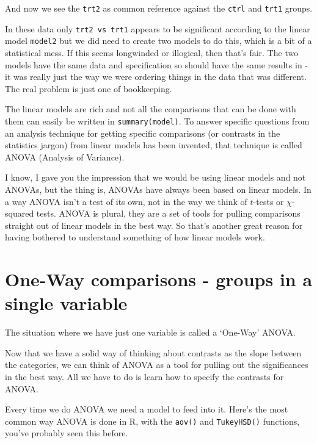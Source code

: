 \documentclass[
]{book}
\newenvironment{sidenote}
{ \begin{tcolorbox}[colbacktitle=blue!50!white,
title=huh?,coltitle=white,
fonttitle=\bfseries] }
{  \end{tcolorbox} }
\begin{document}
And now we see the \texttt{trt2} as common reference against the \texttt{ctrl} and \texttt{trt1} groups.

In these data only \texttt{trt2\ vs\ trt1} appears to be significant according to the linear model \texttt{model2} but we did need to create two models to do this, which is a bit of a statistical mess. If this seems longwinded or illogical, then that's fair. The two models have the same data and specification so should have the same results in - it was really just the way we were ordering things in the data that was different. The real problem is just one of bookkeeping.

The linear models are rich and not all the comparisons that can be done with them can easily be written in \texttt{summary(model)}. To answer specific questions from an analysis technique for getting specific comparisons (or contrasts in the statistics jargon) from linear models has been invented, that technique is called ANOVA (Analysis of Variance).

\begin{sidenote}
I know, I gave you the impression that we would be using linear models and not ANOVAs, but the thing is, ANOVAs have always been based on linear models. In a way ANOVA isn't a test of its own, not in the way we think of \(t\)-tests or \(\chi\)-squared tests. ANOVA is plural, they are a set of tools for pulling comparisons straight out of linear models in the best way. So that's another great reason for having bothered to understand something of how linear models work.
\end{sidenote}

\hypertarget{one-way-comparisons---groups-in-a-single-variable}{%
\section{One-Way comparisons - groups in a single variable}\label{one-way-comparisons---groups-in-a-single-variable}}

The situation where we have just one variable is called a `One-Way' ANOVA.

Now that we have a solid way of thinking about contrasts as the slope between the categories, we can think of ANOVA as a tool for pulling out the significances in the best way. All we have to do is learn how to specify the contrasts for ANOVA.

Every time we do ANOVA we need a model to feed into it. Here's the most common way ANOVA is done in R, with the \texttt{aov()} and \texttt{TukeyHSD()} functions, you've probably seen this before.
\end{document}
